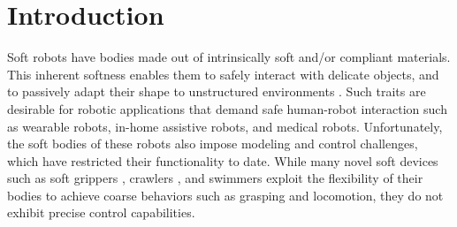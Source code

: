 \section{Introduction} 
\label{sec:intro}

Soft robots have bodies made out of intrinsically soft and/or compliant materials.
This inherent softness enables them to safely interact with delicate objects, and to passively adapt their shape to unstructured environments \cite{rus2015design}.
Such traits are desirable for robotic applications that demand safe human-robot interaction such as wearable robots, in-home assistive robots, and medical robots.
Unfortunately, the soft bodies of these robots also impose modeling and control challenges, which have restricted their functionality to date. 
While many novel soft devices such as soft grippers \cite{ilievski2011soft}, crawlers \cite{tolley2014resilient}, and swimmers \cite{marchese2014autonomous} exploit the flexibility of their bodies to achieve coarse behaviors such as grasping and locomotion, they do not exhibit precise control capabilities.




